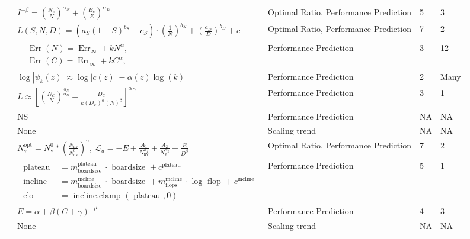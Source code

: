 \begin{table}[]
{\begin{tabular}{lllll}
\cite{hilton2023scaling} & $I^{-\beta}=\left(\frac{N_c}{N}\right)^{\alpha_N}+\left(\frac{E_c}{E}\right)^{\alpha_E}$ & Optimal Ratio, Performance Prediction & 5 & 3 \\
\cite{frantar2023scaling} & $L(S, N, D)=\left(a_S(1-S)^{b_S}+c_S\right) \cdot\left(\frac{1}{N}\right)^{b_N}+\left(\frac{a_D}{D}\right)^{b_D}+c$ & Optimal Ratio, Performance Prediction & 7 & 2 \\
\cite{prato2021scaling} & $\begin{aligned} & \operatorname{Err}(N)=\operatorname{Err}_{\infty}+k N^\alpha, \\ & \operatorname{Err}(C)=\operatorname{Err}_{\infty}+k C^\alpha,\end{aligned}$ & Performance Prediction & 3 & 12 \\
\cite{covert2024scaling} & $\log \left|\psi_k(z)\right| \approx \log |c(z)|-\alpha(z) \log (k)$ & Performance Prediction & 2 & Many \\
\cite{hernandez2021scaling} & $L \approx\left[\left(\frac{N_C}{N}\right)^{\frac{\alpha_N}{\alpha_D}}+\frac{D_C}{k\left(D_F\right)^\alpha(N)^\beta}\right]^{\alpha_D}$ & Performance Prediction & 3 & 1 \\
\cite{ivgi2022scaling} & NS & Performance Prediction & NA & NA \\
\cite{tay2022scaling} & None & Scaling trend & NA & NA \\
\cite{tao2024scaling} & $N_{\mathrm{v}}^{\mathrm{opt}}=N_{\mathrm{v}}^0 *\left(\frac{N_{\mathrm{nv}}}{N_{\mathrm{nv}}^0}\right)^\gamma$, $\mathcal{L}_u=-E+\frac{A_1}{N_{\mathrm{nv}}^{\alpha_1}}+\frac{A_2}{N_{\mathrm{v}}^{\alpha_2}}+\frac{B}{D^\beta}$ & Optimal Ratio, Performance Prediction & 7 & 2 \\
\cite{jones2021scaling} & $\begin{aligned} \text { plateau } & =m_{\text {boardsize }}^{\text {plateau }} \cdot \text { boardsize }+c^{\text {plateau }} \\ \text { incline } & =m_{\text {boardsize }}^{\text {incline }} \cdot \text { boardsize }+m_{\text {flops }}^{\text {incline }} \cdot \log \text { flop }+c^{\text {incline }} \\ \text { elo } & =\text { incline.clamp }(\text { plateau }, 0)\end{aligned}$ & Performance Prediction & 5 & 1 \\
\cite{zhai2022scaling} & $E=\alpha+\beta(C+\gamma)^{-\mu}$ & Performance Prediction & 4 & 3 \\
\cite{dettmers2023case} & None & Scaling trend & NA & NA \\

\end{tabular}}
\end{table}
